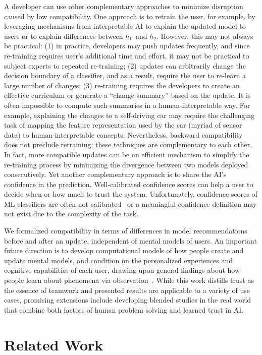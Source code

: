 \documentclass[letterpaper]{article} %
\newcommand{\?}{\mbox{?}}
\newcommand{\hone}{\mbox{$h_1$}}
\newcommand{\htwo}{\mbox{$h_2$}}
\begin{document}
A developer can use other complementary approaches to minimize disruption caused by low compatibility. One approach is to retrain the user, for example, by leveraging mechanisms from interpretable AI to explain the updated model to users or to explain differences between \hone\ and \htwo. However, this may not always be practical: 
(1) in practice, developers may push updates frequently, and since re-training requires user’s additional time and effort, it may not be practical to subject experts to repeated re-training; 
(2) updates can arbitrarily change the decision boundary of a classifier, and as a result, require the user to re-learn a large number of changes;
(3) re-training requires the developers to create an effective curriculum or generate a “change summary” based on the update. It is often impossible to compute such summaries in a human-interpretable way.
For example, explaining the changes to a self-driving car may require the challenging task of mapping the feature representation used by the car (myriad of sensor data) to human-interpretable concepts.
Nevertheless, backward compatibility does not preclude retraining; these techniques are complementary to each other. In fact, more compatible updates can be an efficient mechanism to simplify the re-training process by minimizing the divergence between two models deployed consecutively. Yet another complementary approach is to share the AI's confidence in the prediction. Well-calibrated confidence scores can help a user to decide when or how much to trust the system. Unfortunately, confidence scores of ML classifiers are often not calibrated~\cite{nguyen2015deep} or a meaningful confidence definition may not exist due to the complexity of the task.

We formalized compatibility in terms of differences in model recommendations before and after an update, independent of mental models of users. An important future direction is to develop computational models of how people create and update mental models, and condition on the personalized experiences and cognitive capabilities of each user, drawing upon general findings about how people learn about phenomena via observation~\cite{reber1989implicit}. While this work distills trust as the essence of teamwork and presented results are applicable to a variety of use cases, promising extensions include developing blended studies in the real world that combine both factors of human problem solving and learned trust in AI. 


\section{Related Work}
\end{document}
